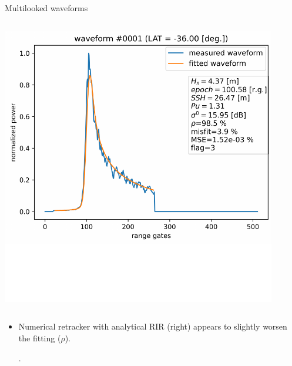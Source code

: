 \documentclass[compress,8pt]{beamer}
\begin{document}
\begin{frame}{Multilooked waveforms}
\begin{columns}
\begin{column}{0.45\textwidth}
\includegraphics[width=0.9\textwidth]{fig/wfm_1_num_PTRana_zoom} 
  
\end{column}
\end{columns}

\begin{itemize}
 \item Numerical retracker with analytical RIR (right) appears to slightly worsen the fitting ($\rho$).
 
 .
\end{itemize}

\end{frame}
\end{document}
